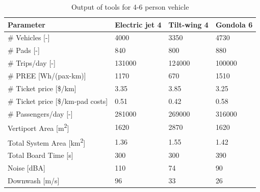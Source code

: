 \begin{table}[H]
\captionsetup{justification=centering}
\caption{Output of tools for 4-6 person vehicle}
\label{46output}
\begin{tabular}{@{}llll@{}}
\toprule
\textbf{Parameter}                           & \textbf{Electric jet 4} & \textbf{Tilt-wing 4} & \textbf{Gondola 6} \\ \midrule
\# Vehicles {[}-{]}                          & 4000                   & 3350                   & 4730                   \\
\# Pads {[}-{]}                              & 840                   & 800                   & 880                    \\
\# Trips/day {[}-{]}                         & 131000                   & 124000               & 100000                   \\
\# PREE {[}Wh/(pax-km){]}                   & 1170                     & 670                    & 1510  \\
\# Ticket price {[}\$/km{]}                  & 3.35                   & 3.85                   & 3.25                    \\
\# Ticket price {[}\$/km-pad costs{]}        & 0.51                    & 0.42                   & 0.58                   \\
\# Passengers/day {[}-{]}                    & 281000                   & 269000                   & 316000                    \\
Vertiport Area {[}m\textsuperscript{2}{]}    & 1620                   & 2870                   & 1620                    \\
Total System Area {[}km\textsuperscript{2}{]}& 1.36                   & 1.55                   & 1.42                   \\
Total Board Time {[}s{]}                     & 300                    & 300                   & 390                   \\
Noise {[}dBA{]}                              & 110                   & 74                   & 90                    \\
Downwash {[}m/s{]}                              &             96       &     33          &          26        \\\bottomrule
\end{tabular}
\end{table}

